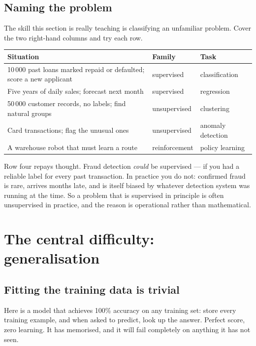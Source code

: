 \documentclass[11pt]{article}
\begin{document}
\subsection{Naming the problem}

The skill this section is really teaching is classifying an unfamiliar problem.
Cover the two right-hand columns and try each row.

\begin{center}
\begin{tabular}{@{}p{7.4cm}ll@{}}
\toprule
\textbf{Situation} & \textbf{Family} & \textbf{Task}\\
\midrule
10\,000 past loans marked repaid or defaulted; score a new applicant
  & supervised & classification\\[3pt]
Five years of daily sales; forecast next month
  & supervised & regression\\[3pt]
50\,000 customer records, no labels; find natural groups
  & unsupervised & clustering\\[3pt]
Card transactions; flag the unusual ones
  & unsupervised & anomaly detection\\[3pt]
A warehouse robot that must learn a route
  & reinforcement & policy learning\\
\bottomrule
\end{tabular}
\end{center}

Row four repays thought. Fraud detection \emph{could} be supervised --- if you
had a reliable label for every past transaction. In practice you do not:
confirmed fraud is rare, arrives months late, and is itself biased by whatever
detection system was running at the time. So a problem that is supervised in
principle is often unsupervised in practice, and the reason is operational
rather than mathematical.

\newpage
\section{The central difficulty: generalisation}
\label{sec:general}

\subsection{Fitting the training data is trivial}

Here is a model that achieves 100\% accuracy on any training set: store every
training example, and when asked to predict, look up the answer. Perfect score,
zero learning. It has memorised, and it will fail completely on anything it has
not seen.
\end{document}
